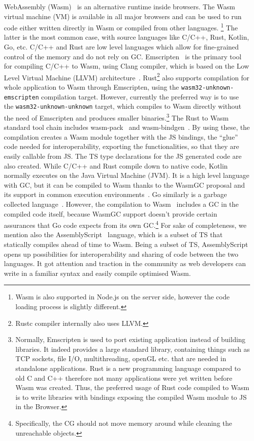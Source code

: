 WebAssembly (Wasm)~\cite{Haas2017,WasmSpecification} is an alternative runtime
inside browsers.
The Wasm virtual machine (VM) is available in all major
browsers and can be used to run code either written directly in Wasm
or compiled from other languages.
\footnote{Wasm is also supported in Node.js on the server side, however the
code loading process is slightly different.} 
The latter is the
most common case, with source languages like C/C++, Rust,
Kotlin, Go, etc. C/C++ and Rust are low level languages
which allow for fine-grained control of the memory
and do not rely on GC. Emscripten~\cite{Zakai2011} is the primary 
tool for compiling C/C++ to Wasm, using Clang compiler,
which is based on the Low Level Virtual Machine
(LLVM) architecture~\cite{LLVM2004}.
Rust\footnote{Rustc compiler internally also uses LLVM.} also supports compilation for whole application to Wasm
through Emscripten, using the \texttt{wasm32-unknown-emscripten}
compilation target.
However, currently the preferred way is to use
the \texttt{wasm32-unknown-unknown} target, which
compiles to Wasm directly without the need of Emscripten
and produces smaller binaries.\footnote{Normally,
Emscripten is used to port existing application instead 
of building libraries. It indeed 
provides a large standard library, 
containing things such as TCP sockets, 
file I/O, multithreading, openGL etc. that are needed in
standalone applications.
Rust is a new programming language compared to
old C and C++ therefore not many applications were yet 
written before Wasm was created. 
Thus, the preferred usage of Rust code compiled to Wasm
is to write libraries with bindings exposing the
compiled Wasm module to JS in the Browser.}
The Rust to Wasm standard tool chain includes 
wasm-pack~\cite{WasmPack} and wasm-bindgen~\cite{WasmBindgen}.
By using these, the compilation creates a Wasm 
module together with the JS bindings, the ``glue'' code
needed for interoperability, exporting the functionalities, 
so that they are easily callable from JS. The TS type declarations 
for the JS generated code are also created.
While C/C++ and Rust compile down to native code, Kotlin normally executes on the
Java Virtual Machine (JVM). It is a high level language with GC,
but it can be compiled to Wasm thanks to the WasmGC proposal
and its support in common execution environments~\cite{WasmGCProposal, WasmGCinV8}.
Go similarly is a garbage collected language~\cite{GoGarbageCollector}.
However, the compilation to Wasm~\cite{GOWasm} 
includes a GC in the compiled code itself, because WasmGC support doesn't
provide certain assurances that Go code expects from its own GC.\footnote{Specifically, the CG should not move memory around while cleaning the unreachable objects.}
For sake of completeness, we mention also the AssemblyScript~\cite{AssemblyScript} language, 
which is a subset of TS that statically compiles ahead of time to Wasm.
Being a subset of TS, AssemblyScript opens up possibilities for
interoperability and sharing of code between the two languages.
It got attention and traction in the community as web developers 
can write in a familiar syntax and easily compile optimised Wasm.

